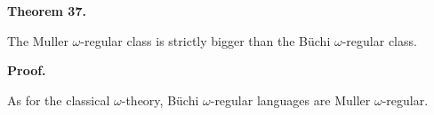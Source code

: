 \documentclass[10pt,a4paper]{article}
\begin{document}
 

 
\par\medskip\noindent\textbf{Theorem 37.}\par
 
 
The Muller $\omega$-regular class is strictly bigger than the Büchi $\omega$-regular class.\par
 
 

 

 
\par\medskip\noindent\textbf{Proof.}\par
 
 
As for the classical $\omega$-theory, Büchi $\omega$-regular languages are Muller $\omega$-regular.\par
 
 
 
\end{document}
